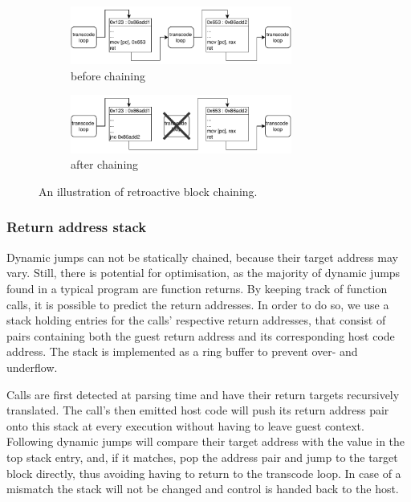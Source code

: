 \begin{figure}[h]
	\begin{center}
		\begin{subfigure}[b]{\textwidth}
			\centering
			\includegraphics[width=0.8\textwidth]{media/chaining-unchained.pdf}
			\caption{before chaining}
		\end{subfigure}
		\begin{subfigure}[b]{\textwidth}
			\centering
			\includegraphics[width=0.8\textwidth]{media/chaining-chained.pdf}
			\caption{after chaining}
		\end{subfigure}
	\end{center}
	
	\caption[Block chaining illustration]%
	{An illustration of retroactive block chaining.}
\end{figure}


\subsubsection{Return address stack}
\label{sec:return-address-stack}
Dynamic jumps can not be statically chained, because their target address may vary.
Still, there is potential for optimisation, as the majority of dynamic jumps found in a typical program are function returns.
By keeping track of function calls, it is possible to predict the return addresses.
In order to do so, we use a stack holding entries for the calls' respective return addresses, that consist of pairs containing both the guest return address and its corresponding host code address.
The stack is implemented as a ring buffer to prevent over- and underflow.

Calls are first detected at parsing time and have their return targets recursively translated.
The call's then emitted host code will push its return address pair onto this stack at every execution without having to leave guest context. %
Following dynamic jumps will compare their target address with the value in the top stack entry, and, if it matches, pop the address pair and jump to the target block directly, thus avoiding having to return to the transcode loop.
In case of a mismatch the stack will not be changed and control is handed back to the host.


